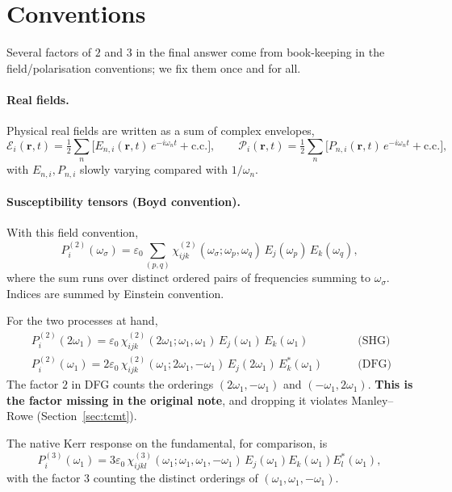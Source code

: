 \documentclass[11pt,a4paper]{article}
\newcommand{\eps}{\varepsilon}
\newcommand{\bvec}[1]{\mathbf{#1}}
\newcommand{\ri}{\bvec{r}}
\newcommand{\chitwo}{\chi^{(2)}}
\newcommand{\chithree}{\chi^{(3)}}
\begin{document}
\section{Conventions}\label{sec:conventions}

Several factors of $2$ and $3$ in the final answer come from book-keeping
in the field/polarisation conventions; we fix them once and for all.

\paragraph{Real fields.}
Physical real fields are written as a sum of complex envelopes,
\begin{equation}
  \mathcal{E}_i(\ri,t)=\tfrac12\sum_n\!\bigl[E_{n,i}(\ri,t)\,e^{-i\omega_n t}+\mathrm{c.c.}\bigr],\qquad
  \mathcal{P}_i(\ri,t)=\tfrac12\sum_n\!\bigl[P_{n,i}(\ri,t)\,e^{-i\omega_n t}+\mathrm{c.c.}\bigr],
\end{equation}
with $E_{n,i},P_{n,i}$ slowly varying compared with $1/\omega_n$.

\paragraph{Susceptibility tensors (Boyd convention).}
With this field convention,
\begin{equation}
  P_i^{(2)}(\omega_\sigma)=\eps_0\!\!\sum_{(p,q)}\!\chitwo_{ijk}(\omega_\sigma;\omega_p,\omega_q)\,E_j(\omega_p)\,E_k(\omega_q),
\end{equation}
where the sum runs over distinct ordered pairs of frequencies summing to
$\omega_\sigma$.  Indices are summed by Einstein convention.

For the two processes at hand,
\begin{align}
  \boxed{\;P_i^{(2)}(2\omega_1)=\eps_0\,\chitwo_{ijk}(2\omega_1;\omega_1,\omega_1)\,E_j(\omega_1)\,E_k(\omega_1)\;}
  &\qquad\text{(SHG)} \label{eq:PSHG}\\[4pt]
  \boxed{\;P_i^{(2)}(\omega_1)=2\eps_0\,\chitwo_{ijk}(\omega_1;2\omega_1,-\omega_1)\,E_j(2\omega_1)\,E_k^*(\omega_1)\;}
  &\qquad\text{(DFG)}\label{eq:PDFG}
\end{align}
The factor $2$ in DFG counts the orderings $(2\omega_1,-\omega_1)$ and
$(-\omega_1,2\omega_1)$.  \textbf{This is the factor missing in the
original note}, and dropping it violates Manley--Rowe (Section~\ref{sec:tcmt}).

The native Kerr response on the fundamental, for comparison, is
\begin{equation}
  P_i^{(3)}(\omega_1)=3\eps_0\,\chithree_{ijkl}(\omega_1;\omega_1,\omega_1,-\omega_1)\,
                     E_j(\omega_1)E_k(\omega_1)E_l^*(\omega_1),
\end{equation}
with the factor $3$ counting the distinct orderings of
$(\omega_1,\omega_1,-\omega_1)$.
\end{document}
